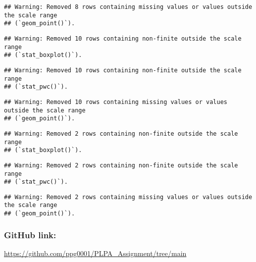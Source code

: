 \documentclass[
]{article}
\begin{document}
\begin{verbatim}
## Warning: Removed 8 rows containing missing values or values outside the scale range
## (`geom_point()`).
\end{verbatim}

\begin{verbatim}
## Warning: Removed 10 rows containing non-finite outside the scale range
## (`stat_boxplot()`).
\end{verbatim}

\begin{verbatim}
## Warning: Removed 10 rows containing non-finite outside the scale range
## (`stat_pwc()`).
\end{verbatim}

\begin{verbatim}
## Warning: Removed 10 rows containing missing values or values outside the scale range
## (`geom_point()`).
\end{verbatim}

\begin{verbatim}
## Warning: Removed 2 rows containing non-finite outside the scale range
## (`stat_boxplot()`).
\end{verbatim}

\begin{verbatim}
## Warning: Removed 2 rows containing non-finite outside the scale range
## (`stat_pwc()`).
\end{verbatim}

\begin{verbatim}
## Warning: Removed 2 rows containing missing values or values outside the scale range
## (`geom_point()`).
\end{verbatim}

\subsubsection{GitHub link:}\label{github-link}

\url{https://github.com/ppg0001/PLPA_Assignment/tree/main}
\end{document}

